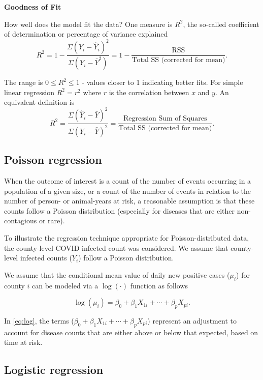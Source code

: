 \documentclass[]{book}
\begin{document}
\textbf{Goodness of Fit}

How well does the model fit the data? One measure is \(R^2\), the
so-called coefficient of determination or percentage of variance
explained \[
R^2 = 1- \frac{\Sigma (Y_i-\hat{Y}_i)^2}{\Sigma (Y_i-\bar{Y}^2)} = 1-
\frac{\mbox{RSS}}{\mbox{Total SS (corrected for mean)}}.
\]

The range is \(0 \le R^2 \le 1\) - values closer to 1 indicating better
fits. For simple linear regression \(R^2=r^2\) where \(r\) is the
correlation between \(x\) and \(y\). An equivalent definition is \[
R^2 = \frac{\Sigma (\hat{Y}_i-\bar{Y})^2}{\Sigma (Y_i-\bar{Y})^2} = \frac{\mbox{Regression Sum of Squares}}{\mbox{Total SS (corrected for mean)}}.
\]

\subsection{Poisson regression}\label{poisson-regression}

When the outcome of interest is a count of the number of events
occurring in a population of a given size, or a count of the number of
events in relation to the number of person- or animal-years at risk, a
reasonable assumption is that these counts follow a Poisson distribution
(especially for diseases that are either non-contagious or rare).

To illustrate the regression technique appropriate for
Poisson-distributed data, the county-level COVID infected count was
considered. We assume that county-level infected counts (\(Y_i\)) follow
a Poisson distribution.

We assume that the conditional mean value of daily new positive cases
(\(\mu_i\)) for county \(i\) can be modeled via a \(\log(\cdot)\)
function as follows

\begin{equation} 
\log(\mu_i) = \beta_0+\beta_1X_{1i} +\cdots +\beta_pX_{pi}. 
\label{eq:log}
\end{equation}

In \eqref{eq:log}, the terms
(\(\beta_0+\beta_1X_{1i} +\cdots +\beta_pX_{pi}\)) represent an
adjustment to account for disease counts that are either above or below
that expected, based on time at risk.

\subsection{Logistic regression}\label{logistic-regression}
\end{document}
